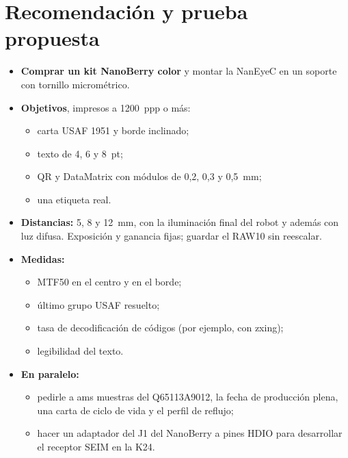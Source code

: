 \documentclass[11pt,a4paper]{article}
\begin{document}
\section{Recomendación y prueba propuesta}\label{sec:prueba}
\begin{itemize}
  \item \textbf{Comprar un kit NanoBerry color} y montar la NanEyeC en un soporte con tornillo micrométrico.
  \item \textbf{Objetivos}, impresos a 1200~ppp o más:
  \begin{itemize}
    \item carta USAF 1951 y borde inclinado;
    \item texto de 4, 6 y 8~pt;
    \item QR y DataMatrix con módulos de 0,2, 0,3 y 0,5~mm;
    \item una etiqueta real.
  \end{itemize}
  \item \textbf{Distancias:} 5, 8 y 12~mm, con la iluminación final del robot y además con luz difusa. Exposición y ganancia fijas; guardar el RAW10 sin reescalar.
  \item \textbf{Medidas:}
  \begin{itemize}
    \item MTF50 en el centro y en el borde;
    \item último grupo USAF resuelto;
    \item tasa de decodificación de códigos (por ejemplo, con zxing);
    \item legibilidad del texto.
  \end{itemize}
  \item \textbf{En paralelo:}
  \begin{itemize}
    \item pedirle a ams muestras del Q65113A9012, la fecha de producción plena, una carta de ciclo de vida y el perfil de reflujo;
    \item hacer un adaptador del J1 del NanoBerry a pines HDIO para desarrollar el receptor SEIM en la K24.
  \end{itemize}
\end{itemize}

\end{document}
